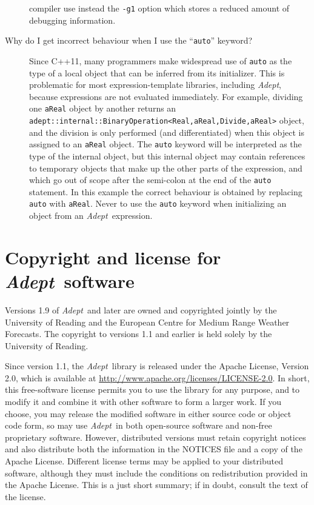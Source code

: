 \documentclass[a4,oneside]{book}
\def\codesize{\small}
\def\Adept{\emph{Adept}}
\def\code#1{{\codesize\texttt{#1}}}
\begin{document}
\begin{description}
  compiler use instead the \code{-g1} option which stores a reduced
  amount of debugging information.
\item[Why do I get incorrect behaviour when I use the ``\code{auto}''
  keyword?] Since C++11, many programmers make widespread use of
  \code{auto} as the type of a local object that can be inferred from
  its initializer. This is problematic for most expression-template
  libraries, including \Adept, because expressions are not evaluated
  immediately.  For example, dividing one \code{aReal} object by
  another returns an
  \code{adept::internal::BinaryOperation<Real,aReal,Divide,aReal>}
  object, and the division is only performed (and differentiated) when
  this object is assigned to an \code{aReal} object. The \code{auto}
  keyword will be interpreted as the type of the internal object, but
  this internal object may contain references to temporary objects
  that make up the other parts of the expression, and which go out of
  scope after the semi-colon at the end of the \code{auto} statement.
  In this example the correct behaviour is obtained by replacing
  \code{auto} with \code{aReal}.  Never to use the \code{auto} keyword
  when initializing an object from an \Adept\ expression.
\end{description}
\section{Copyright and license for \Adept\ software}
\label{sec:license}
Versions 1.9 of \Adept\ and later are owned and copyrighted jointly by
the University of Reading and the European Centre for Medium Range
Weather Forecasts. The copyright to versions 1.1 and earlier is held
solely by the University of Reading.

Since version 1.1, the \Adept\ library is released under the Apache
License, Version 2.0, which is available at
\url{http://www.apache.org/licenses/LICENSE-2.0}.  In short, this
free-software license permits you to use the library for any purpose,
and to modify it and combine it with other software to form a larger
work.  If you choose, you may release the modified software in either
source code or object code form, so may use \Adept\ in both
open-source software and non-free proprietary software. However,
distributed versions must retain copyright notices and also distribute
both the information in the NOTICES file and a copy of the Apache
License.  Different license terms may be applied to your distributed
software, although they must include the conditions on redistribution
provided in the Apache License.  This is a just short summary; if in
doubt, consult the text of the license.
\end{document}

